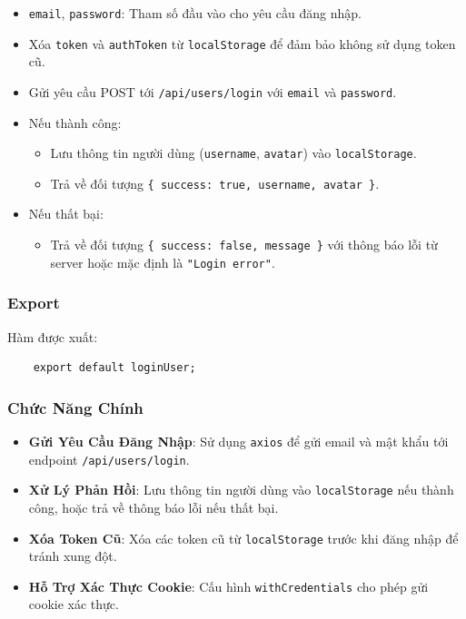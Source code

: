                 \begin{itemize}
                    \item \texttt{email}, \texttt{password}: Tham số đầu vào cho yêu cầu đăng nhập.
                    \item Xóa \texttt{token} và \texttt{authToken} từ \texttt{localStorage} để đảm bảo không sử dụng token cũ.
                    \item Gửi yêu cầu POST tới \texttt{/api/users/login} với \texttt{email} và \texttt{password}.
                    \item Nếu thành công:
                    \begin{itemize}
                        \item Lưu thông tin người dùng (\texttt{username}, \texttt{avatar}) vào \texttt{localStorage}.
                        \item Trả về đối tượng \texttt{\{ success: true, username, avatar \}}.
                    \end{itemize}
                    \item Nếu thất bại:
                    \begin{itemize}
                        \item Trả về đối tượng \texttt{\{ success: false, message \}} với thông báo lỗi từ server hoặc mặc định là \texttt{"Login error"}.
                    \end{itemize}
                \end{itemize}

            \subsubsection{Export}
                \hspace*{0.6cm}Hàm được xuất:
                \begin{lstlisting}
    export default loginUser;
                \end{lstlisting}

            \subsubsection{Chức Năng Chính}
                \begin{itemize}
                    \item \textbf{Gửi Yêu Cầu Đăng Nhập}: Sử dụng \texttt{axios} để gửi email và mật khẩu tới endpoint \texttt{/api/users/login}.
                    \item \textbf{Xử Lý Phản Hồi}: Lưu thông tin người dùng vào \texttt{localStorage} nếu thành công, hoặc trả về thông báo lỗi nếu thất bại.
                    \item \textbf{Xóa Token Cũ}: Xóa các token cũ từ \texttt{localStorage} trước khi đăng nhập để tránh xung đột.
                    \item \textbf{Hỗ Trợ Xác Thực Cookie}: Cấu hình \texttt{withCredentials} cho phép gửi cookie xác thực.
                \end{itemize}
